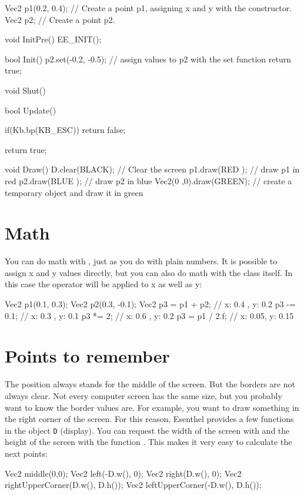 \begin{code}
Vec2 p1(0.2, 0.4); // Create a point p1, assigning x and y with the constructor.
Vec2 p2;           // Create a point p2.

void InitPre()
{
   EE_INIT();
}

bool Init()
{
   p2.set(-0.2, -0.5); // assign values to p2 with the set function
   return true;
}

void Shut() {}

bool Update()
{
   if(Kb.bp(KB_ESC)) return false;
   
   return true;
}

void Draw()
{
   D.clear(BLACK); // Clear the screen
   p1.draw(RED  ); // draw p1 in red  
   p2.draw(BLUE ); // draw p2 in blue
   Vec2(0 ,0).draw(GREEN); // create a temporary object and draw it in green
}

\end{code}

\section{Math}
You can do math with , just as you do with plain numbers. It is possible to assign x and y values directly, but you can also do math with the class itself. In this case the operator will be applied to x as well as y:

\begin{code}
Vec2 p1(0.1,  0.3);
Vec2 p2(0.3, -0.1);
Vec2 p3 = p1 + p2;  // x: 0.4 , y: 0.2
p3 -= 0.1;          // x: 0.3 , y: 0.1
p3 *= 2;            // x: 0.6 , y: 0.2
p3 = p1 / 2.f;      // x: 0.05, y: 0.15 
\end{code}

\section{Points to remember}
The position  always stands for the middle of the screen. But the borders are not always clear. Not every computer screen has the same size, but you probably want to know the border values are. For example, you want to draw something in the right corner of the screen. For this reason, Esenthel provides a few functions in the object \texttt{D} (display). You can request the width of the screen with  and the height of the screen with the function . This makes it very easy to calculate the next points:

\begin{code}
Vec2 middle(0,0);
Vec2 left(-D.w(), 0);
Vec2 right(D.w(), 0);
Vec2 rightUpperCorner(D.w(), D.h());
Vec2 leftUpperCorner(-D.w(), D.h());
\end{code}

